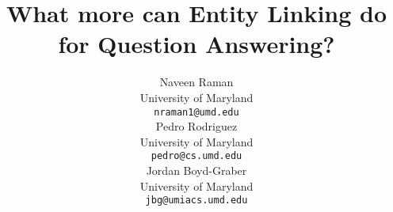 \documentclass{article}
\title{What more can Entity Linking do for Question Answering?}
\author{Naveen Raman \\
	University of Maryland \\
	\texttt{nraman1@umd.edu} \\
	\And
	Pedro Rodriguez \\
	University of Maryland \\
	\texttt{pedro@cs.umd.edu} \\
	\And
	Jordan Boyd-Graber \\
	University of Maryland \\
	\texttt{jbg@umiacs.umd.edu} \\
}
\begin{document}
\maketitle

\begin{abstract} 
	
\end{abstract}









\end{document}
